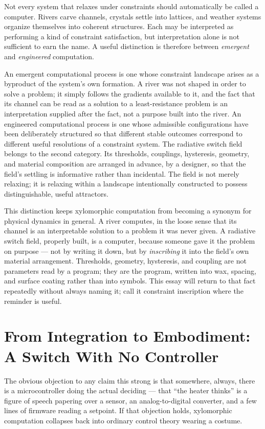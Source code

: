 \documentclass[11pt]{article}
\begin{document}
Not every system that relaxes under constraints should automatically be called a computer. Rivers carve channels, crystals settle into lattices, and weather systems organize themselves into coherent structures. Each may be interpreted as performing a kind of constraint satisfaction, but interpretation alone is not sufficient to earn the name. A useful distinction is therefore between \emph{emergent} and \emph{engineered} computation.

An emergent computational process is one whose constraint landscape arises as a byproduct of the system's own formation. A river was not shaped in order to solve a problem; it simply follows the gradients available to it, and the fact that its channel can be read as a solution to a least-resistance problem is an interpretation supplied after the fact, not a purpose built into the river. An engineered computational process is one whose admissible configurations have been deliberately structured so that different stable outcomes correspond to different useful resolutions of a constraint system. The radiative switch field belongs to the second category. Its thresholds, couplings, hysteresis, geometry, and material composition are arranged in advance, by a designer, so that the field's settling is informative rather than incidental. The field is not merely relaxing; it is relaxing within a landscape intentionally constructed to possess distinguishable, useful attractors.

This distinction keeps xylomorphic computation from becoming a synonym for physical dynamics in general. A river computes, in the loose sense that its channel is an interpretable solution to a problem it was never given. A radiative switch field, properly built, is a computer, because someone gave it the problem on purpose --- not by writing it down, but by \emph{inscribing} it into the field's own material arrangement. Thresholds, geometry, hysteresis, and coupling are not parameters read by a program; they are the program, written into wax, spacing, and surface coating rather than into symbols. This essay will return to that fact repeatedly without always naming it; call it constraint inscription where the reminder is useful.

\section{From Integration to Embodiment: A Switch With No Controller}

The obvious objection to any claim this strong is that somewhere, always, there is a microcontroller doing the actual deciding --- that ``the heater thinks'' is a figure of speech papering over a sensor, an analog-to-digital converter, and a few lines of firmware reading a setpoint. If that objection holds, xylomorphic computation collapses back into ordinary control theory wearing a costume.
\end{document}
